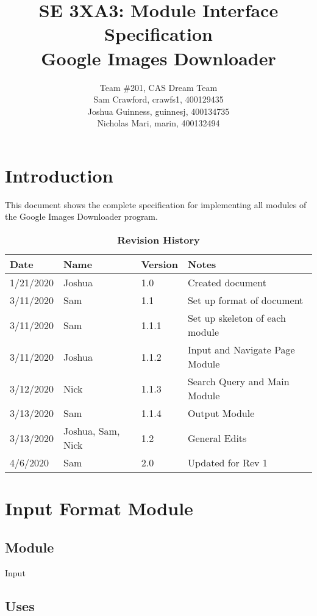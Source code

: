 \documentclass{article}
\title{SE 3XA3: Module Interface Specification\\Google Images Downloader}
\author{Team \#201, CAS Dream Team
		\\ Sam Crawford, crawfs1, 400129435
		\\ Joshua Guinness, guinnesj, 400134735
		\\ Nicholas Mari, marin, 400132494
}
\begin{document}
\maketitle




\section*{Introduction}

This document shows the complete specification for implementing all modules of the Google Images Downloader program.

\begin{table}[bp]
\begin{tabularx}{\textwidth}{llll}
\toprule {\bf Date} & {\bf Name} & {\bf Version} & {\bf Notes}\\
\midrule
1/21/2020 & Joshua & 1.0 & Created document\\
3/11/2020 & Sam & 1.1 & Set up format of document\\
3/11/2020 & Sam & 1.1.1 & Set up skeleton of each module\\
3/11/2020 & Joshua & 1.1.2 & Input and Navigate Page Module\\
3/12/2020 & Nick & 1.1.3 & Search Query and Main Module\\
3/13/2020 & Sam & 1.1.4 & Output Module\\
3/13/2020 & Joshua, Sam, Nick & 1.2 & General Edits\\
\color{red}4/6/2020 & \color{red}Sam & 
\color{red}2.0 & \color{red}Updated for Rev 1\\
\bottomrule
\end{tabularx}
\caption{\bf Revision History}
\end{table}

\newpage

\section*{Input Format Module}

\subsection* {Module}

Input

\subsection* {Uses}
\end{document}

